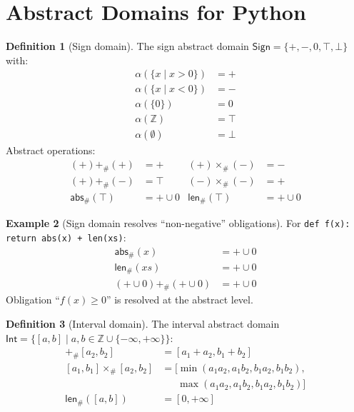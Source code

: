 \documentclass[11pt,a4paper]{report}
\theoremstyle{definition}
\newtheorem{definition}{Definition}[chapter]
\newtheorem{example}[definition]{Example}
\theoremstyle{plain}
\begin{document}
\section{Abstract Domains for Python}

\begin{definition}[Sign domain]
The sign abstract domain $\mathsf{Sign} = \{+, -, 0, \top, \bot\}$ with:
\begin{align}
  \alpha(\{x \mid x > 0\}) &= + \\
  \alpha(\{x \mid x < 0\}) &= - \\
  \alpha(\{0\}) &= 0 \\
  \alpha(\mathbb{Z}) &= \top \\
  \alpha(\emptyset) &= \bot
\end{align}
Abstract operations:
\begin{align}
  (+) +_\# (+) &= + & (+) \times_\# (-) &= - \\
  (+) +_\# (-) &= \top & (-) \times_\# (-) &= + \\
  \mathsf{abs}_\#(\top) &= + \cup 0 & \mathsf{len}_\#(\top) &= + \cup 0
\end{align}
\end{definition}

\begin{example}[Sign domain resolves ``non-negative'' obligations]
For \lstinline[style=python]{def f(x): return abs(x) + len(xs)}:
\begin{align}
  \mathsf{abs}_\#(x) &= + \cup 0 \\
  \mathsf{len}_\#(xs) &= + \cup 0 \\
  (+ \cup 0) +_\# (+ \cup 0) &= + \cup 0
\end{align}
Obligation ``$f(x) \geq 0$'' is resolved at the abstract level.
\end{example}

\begin{definition}[Interval domain]
The interval abstract domain $\mathsf{Int} = \{[a, b] \mid a, b \in \mathbb{Z} \cup \{-\infty, +\infty\}\}$:
\begin{align}
  [a_1, b_1] +_\# [a_2, b_2] &= [a_1 + a_2, b_1 + b_2] \\
  [a_1, b_1] \times_\# [a_2, b_2] &= [\min(a_1 a_2, a_1 b_2, b_1 a_2, b_1 b_2), \\
  &\quad\;\; \max(a_1 a_2, a_1 b_2, b_1 a_2, b_1 b_2)] \\
  \mathsf{len}_\#([a, b]) &= [0, +\infty]
\end{align}
\end{definition}
\end{document}
